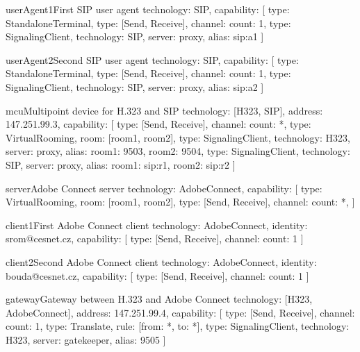 \begin{TopologyExample}{userAgent1}{First SIP user agent}
technology: SIP,
capability: [
  {type: StandaloneTerminal}, {type: [Send, Receive], channel: {count: 1}}, 
  {type: SignalingClient, technology: SIP, server: proxy, alias: sip:a1}
]
\end{TopologyExample}

\begin{TopologyExample}{userAgent2}{Second SIP user agent}
technology: SIP,
capability: [
  {type: StandaloneTerminal}, {type: [Send, Receive], channel: {count: 1}}, 
  {type: SignalingClient, technology: SIP, server: proxy, alias: sip:a2}
]
\end{TopologyExample}

\begin{TopologyExample}{mcu}{Multipoint device for H.323 and SIP}
technology: [H323, SIP], address: 147.251.99.3,
capability: [
  {type: [Send, Receive], channel: {count: *}}, 
  {type: VirtualRooming, room: [room1, room2]},
  {type: SignalingClient, technology: H323, server: proxy, 
     alias: {room1: 9503, room2: 9504}},
  {type: SignalingClient, technology: SIP, server: proxy, 
     alias: {room1: sip:r1, room2: sip:r2}}
]
\end{TopologyExample}

\begin{TopologyExample}{server}{Adobe Connect server}
technology: AdobeConnect,
capability: [
  {type: VirtualRooming, room: [room1, room2]}, 
  {type: [Send, Receive], channel: {count: *}}, 
]
\end{TopologyExample}

\begin{TopologyExample}{client1}{First Adobe Connect client}
technology: AdobeConnect, identity: srom@cesnet.cz,
capability: [
  {type: [Send, Receive], channel: {count: 1}}
]
\end{TopologyExample}

\begin{TopologyExample}{client2}{Second Adobe Connect client}
technology: AdobeConnect, identity: bouda@cesnet.cz,
capability: [
  {type: [Send, Receive], channel: {count: 1}}
]
\end{TopologyExample}

\begin{TopologyExample}{gateway}{Gateway between H.323 and Adobe Connect}
technology: [H323, AdobeConnect], address: 147.251.99.4,
capability: [
  {type: [Send, Receive], channel: {count: 1}},
  {type: Translate, rule: [{from: *, to: *}]},
  {type: SignalingClient, technology: H323, server: gatekeeper, alias: 9505}
]
\end{TopologyExample}

